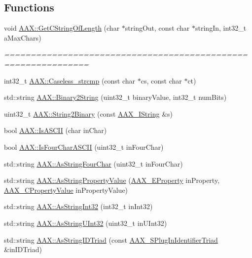 \subsection*{Functions}
\begin{DoxyCompactItemize}
\item 
void \hyperlink{a00288_aa3db8a743884054a6ac1ec2c2495e86f}{A\+A\+X\+::\+Get\+C\+String\+Of\+Length} (char $\ast$string\+Out, const char $\ast$string\+In, int32\+\_\+t a\+Max\+Chars)
\begin{DoxyCompactList}\small\item\em ============================================================== \end{DoxyCompactList}\item 
int32\+\_\+t \hyperlink{a00288_a5f092aff54cbd222fda57f5ea0a12189}{A\+A\+X\+::\+Caseless\+\_\+strcmp} (const char $\ast$cs, const char $\ast$ct)
\item 
std\+::string \hyperlink{a00288_a690ffc499da04ea963fff3bf8d6174fb}{A\+A\+X\+::\+Binary2\+String} (uint32\+\_\+t binary\+Value, int32\+\_\+t num\+Bits)
\item 
uint32\+\_\+t \hyperlink{a00288_a7b02e5d4a96f72213f0d1e4b52e13050}{A\+A\+X\+::\+String2\+Binary} (const \hyperlink{a00113}{A\+A\+X\+\_\+\+I\+String} \&s)
\item 
bool \hyperlink{a00288_aa8ebc6a8ee1232c4ffec828bff3c2998}{A\+A\+X\+::\+Is\+A\+S\+C\+I\+I} (char in\+Char)
\item 
bool \hyperlink{a00288_a00fbf59b268ca75214b2dad68be8ff77}{A\+A\+X\+::\+Is\+Four\+Char\+A\+S\+C\+I\+I} (uint32\+\_\+t in\+Four\+Char)
\item 
std\+::string \hyperlink{a00288_a22eda3cc42cb4ea2192b00bab7a69b02}{A\+A\+X\+::\+As\+String\+Four\+Char} (uint32\+\_\+t in\+Four\+Char)
\item 
std\+::string \hyperlink{a00288_a1b3d4b5a967f01922963876447644b15}{A\+A\+X\+::\+As\+String\+Property\+Value} (\hyperlink{a00283_a6571f4e41a5dd06e4067249228e2249e}{A\+A\+X\+\_\+\+E\+Property} in\+Property, \hyperlink{a00149_ab247c0d8686c14e05cbb567ef276f249}{A\+A\+X\+\_\+\+C\+Property\+Value} in\+Property\+Value)
\item 
std\+::string \hyperlink{a00288_ab024a3d9ac9c68350b377b2c70ec4727}{A\+A\+X\+::\+As\+String\+Int32} (int32\+\_\+t in\+Int32)
\item 
std\+::string \hyperlink{a00288_ada4fd7cb0e04582a7615a76f6be7e404}{A\+A\+X\+::\+As\+String\+U\+Int32} (uint32\+\_\+t in\+U\+Int32)
\item 
std\+::string \hyperlink{a00288_a89e00fcb44e30c443bebba0f026ef62a}{A\+A\+X\+::\+As\+String\+I\+D\+Triad} (const \hyperlink{a00127}{A\+A\+X\+\_\+\+S\+Plug\+In\+Identifier\+Triad} \&in\+I\+D\+Triad)

\end{DoxyCompactItemize}
